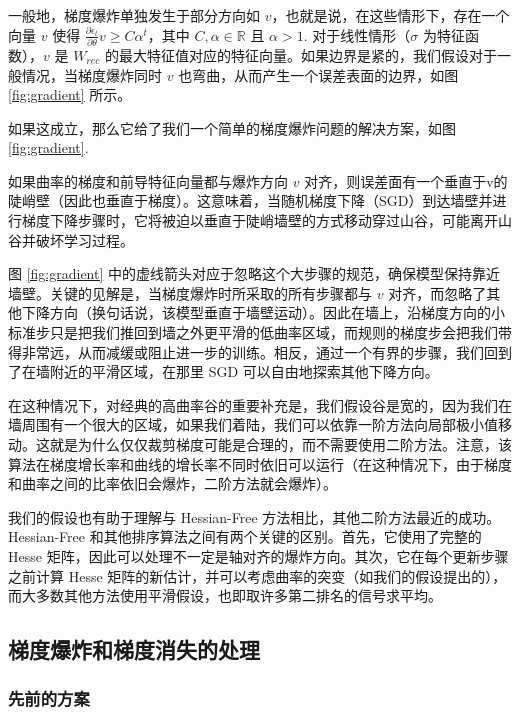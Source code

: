 一般地，梯度爆炸单独发生于部分方向如 \(v\)，也就是说，在这些情形下，存在一个向量 \(v\) 使得 \(\frac{\partial\epsilon_t}{\partial\theta}v\geq C\alpha^t\)，其中 \(C,\alpha\in\mathbb{R}\) 且 \(\alpha>1\). 对于线性情形（\(\sigma\) 为特征函数），\(v\) 是 \(W_{rec}\) 的最大特征值对应的特征向量。如果边界是紧的，我们假设对于一般情况，当梯度爆炸同时 \(v\) 也弯曲，从而产生一个误差表面的边界，如图 \ref{fig:gradient} 所示。

如果这成立，那么它给了我们一个简单的梯度爆炸问题的解决方案，如图 \ref{fig:gradient}.

如果曲率的梯度和前导特征向量都与爆炸方向 \(v\) 对齐，则误差面有一个垂直于v的陡峭壁（因此也垂直于梯度）。这意味着，当随机梯度下降（SGD）到达墙壁并进行梯度下降步骤时，它将被迫以垂直于陡峭墙壁的方式移动穿过山谷，可能离开山谷并破坏学习过程。

图 \ref{fig:gradient} 中的虚线箭头对应于忽略这个大步骤的规范，确保模型保持靠近墙壁。关键的见解是，当梯度爆炸时所采取的所有步骤都与 \(v\) 对齐，而忽略了其他下降方向（换句话说，该模型垂直于墙壁运动）。因此在墙上，沿梯度方向的小标准步只是把我们推回到墙之外更平滑的低曲率区域，而规则的梯度步会把我们带得非常远，从而减缓或阻止进一步的训练。相反，通过一个有界的步骤，我们回到了在墙附近的平滑区域，在那里 SGD 可以自由地探索其他下降方向。

在这种情况下，对经典的高曲率谷的重要补充是，我们假设谷是宽的，因为我们在墙周围有一个很大的区域，如果我们着陆，我们可以依靠一阶方法向局部极小值移动。这就是为什么仅仅裁剪梯度可能是合理的，而不需要使用二阶方法。注意，该算法在梯度增长率和曲线的增长率不同时依旧可以运行（在这种情况下，由于梯度和曲率之间的比率依旧会爆炸，二阶方法就会爆炸）。

我们的假设也有助于理解与 Hessian-Free 方法相比，其他二阶方法最近的成功。Hessian-Free 和其他排序算法之间有两个关键的区别。首先，它使用了完整的 Hesse 矩阵，因此可以处理不一定是轴对齐的爆炸方向。其次，它在每个更新步骤之前计算 Hesse 矩阵的新估计，并可以考虑曲率的突变（如我们的假设提出的），而大多数其他方法使用平滑假设，也即取许多第二排名的信号求平均。

\subsection{梯度爆炸和梯度消失的处理}\label{3-ux68afux5ea6ux7206ux70b8ux548cux68afux5ea6ux6d88ux5931ux7684ux5904ux7406}

\subsubsection{先前的方案}\label{31-ux5148ux524dux7684ux65b9ux6848}

